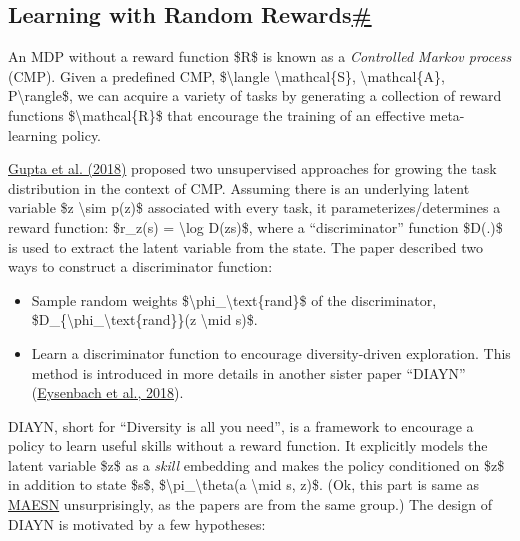 \subsection{\texorpdfstring{Learning with Random Rewards\hyperref[learning-with-random-rewards]{\#}}{Learning with Random Rewards\#}}\label{learning-with-random-rewards}

An MDP without a reward function \$R\$ is known as a \emph{Controlled Markov process} (CMP). Given a predefined CMP, \$\textbackslash langle \textbackslash mathcal\{S\}, \textbackslash mathcal\{A\}, P\textbackslash rangle\$, we can acquire a variety of tasks by generating a collection of reward functions \$\textbackslash mathcal\{R\}\$ that encourage the training of an effective meta-learning policy.

\href{https://arxiv.org/abs/1806.04640}{Gupta et al. (2018)} proposed two unsupervised approaches for growing the task distribution in the context of CMP. Assuming there is an underlying latent variable \$z \textbackslash sim p(z)\$ associated with every task, it parameterizes/determines a reward function: \$r\_z(s) = \textbackslash log D(z\textbar s)\$, where a ``discriminator'' function \$D(.)\$ is used to extract the latent variable from the state. The paper described two ways to construct a discriminator function:

\begin{itemize}
\tightlist
\item
  Sample random weights \$\textbackslash phi\_\textbackslash text\{rand\}\$ of the discriminator, \$D\_\{\textbackslash phi\_\textbackslash text\{rand\}\}(z \textbackslash mid s)\$.
\item
  Learn a discriminator function to encourage diversity-driven exploration. This method is introduced in more details in another sister paper ``DIAYN'' (\href{https://arxiv.org/abs/1802.06070}{Eysenbach et al., 2018}).
\end{itemize}

DIAYN, short for ``Diversity is all you need'', is a framework to encourage a policy to learn useful skills without a reward function. It explicitly models the latent variable \$z\$ as a \emph{skill} embedding and makes the policy conditioned on \$z\$ in addition to state \$s\$, \$\textbackslash pi\_\textbackslash theta(a \textbackslash mid s, z)\$. (Ok, this part is same as \hyperref[meta-learning-the-exploration-strategies]{MAESN} unsurprisingly, as the papers are from the same group.) The design of DIAYN is motivated by a few hypotheses:

